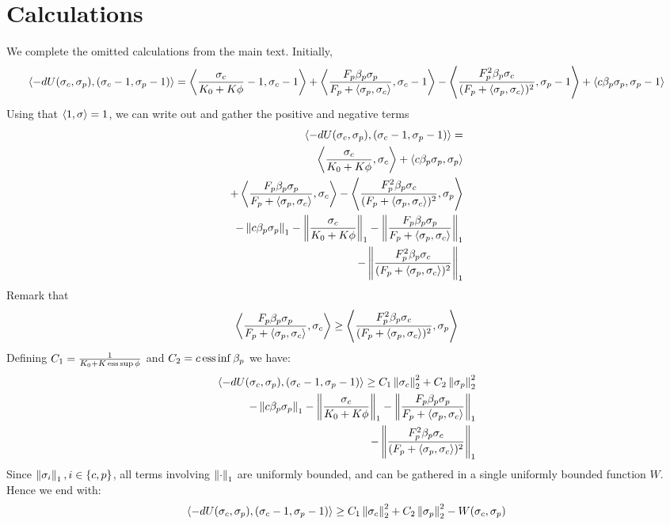 \section{Calculations}
\label{appendix:calculations}
We complete the omitted calculations from the main text. Initially,
\begin{equation}
  \label{eq:calc_app}
  \ip{-dU(\sigma_c,\sigma_p)}{(\sigma_c-1, \sigma_p-1)} = \ip{\frac{\sigma_c}{K_0 + K\phi} - 1}{\sigma_c
  - 1} + \ip{\frac{F_p\beta_p\sigma_p}{F_p + \ip{\sigma_p}{\sigma_c}}}{\sigma_c-1}
  - \ip{\frac{F_p^2\beta_p\sigma_c}{(F_p + \ip{\sigma_p}{\sigma_c})^2}}{\sigma_p - 1} + \ip{c \beta_p \sigma_p}{\sigma_p -1}
\end{equation}
Using that $\left \langle 1,\sigma \right \rangle = 1$, we can write out  and gather the positive and negative terms
\begin{equation}
  \begin{split}
  \ip{-dU(\sigma_c,\sigma_p)}{(\sigma_c-1, \sigma_p-1)} = \\
  \ip{\frac{\sigma_c}{K_0 + K\phi}}{\sigma_c} + \ip{c \beta_p \sigma_p}{\sigma_p} \\ + \ip{\frac{F_p\beta_p\sigma_p}{F_p + \ip{\sigma_p}{\sigma_c}}}{\sigma_c} - \ip{\frac{F_p^2\beta_p\sigma_c}{(F_p + \ip{\sigma_p}{\sigma_c})^2}}{\sigma_p} \\
  - \norm{c\beta_p \sigma_p}_1 - \norm{\frac{\sigma_c}{K_0 + K\phi}}_1 - \norm{\frac{F_p\beta_p\sigma_p}{F_p + \ip{\sigma_p}{\sigma_c}}}_1 \\
   - \norm{\frac{F_p^2\beta_p\sigma_c}{(F_p + \ip{\sigma_p}{\sigma_c})^2}}_1
\end{split}
\end{equation}
Remark that
\begin{equation}
  \left \langle \frac{F_p\beta_p\sigma_p}{F_p + \left \langle \sigma_p,\sigma_c \right \rangle},\sigma_c \right \rangle \geq \left \langle \frac{F_p^2\beta_p\sigma_c}{(F_p + \left \langle \sigma_p,\sigma_c \right \rangle)^2},\sigma_p \right \rangle
\end{equation}
Defining $C_1 = \frac{1}{K_0 + K \ess \sup \phi}$ and $C_2 = c \operatorname{ess} \inf \beta_p$ we have:
\begin{equation}
  \begin{split}
  \ip{-dU(\sigma_c,\sigma_p)}{(\sigma_c-1, \sigma_p-1)} \geq C_1 \norm{\sigma_c}^2_2 + C_2 \norm{\sigma_p}_2^2 \\
  - \norm{c\beta_p \sigma_p}_1 - \norm{\frac{\sigma_c}{K_0 + K\phi}}_1 - \norm{\frac{F_p\beta_p\sigma_p}{F_p + \ip{\sigma_p}{\sigma_c}}}_1 \\
   - \norm{\frac{F_p^2\beta_p\sigma_c}{(F_p + \ip{\sigma_p}{\sigma_c})^2}}_1
  \end{split}
\end{equation}
Since $\left \Vert \sigma_i \right \Vert_1, i \in \{c,p\}$, all terms involving $\left \Vert \cdot \right \Vert_1$ are uniformly bounded, and can be gathered in a single uniformly bounded function $W$. Hence we end with:
\begin{equation}
    \left \langle -dU(\sigma_c,\sigma_p),(\sigma_c-1, \sigma_p-1) \right \rangle \geq C_1 \left \Vert \sigma_c \right \Vert_2^2 + C_2 \left \Vert \sigma_p \right \Vert_2^2 - W(\sigma_c,\sigma_p)
\end{equation}
